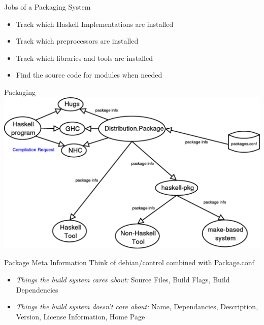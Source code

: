 \documentclass[pdf,rico,slideColor,colorBG]{prosper}
\begin{document}
\begin{slide}{Jobs of a Packaging System}
  \begin{itemize}
  \item Track which Haskell Implementations are installed
  \item Track which preprocessors are installed
  \item Track which libraries and tools are installed
  \item Find the source code for modules when needed
  \end{itemize}
\end{slide}
\begin{slide}{Packaging}
   \includegraphics[width=.9\textwidth]{Packaging.eps}
\end{slide}

\begin{slide}{Package Meta Information}
Think of debian/control combined with Package.conf
\begin{itemize}
  \item \emph{Things the build system cares about:} Source Files, Build Flags, Build Dependencies
  \item \emph{Things the build system doesn't care about:} Name, Dependancies, Description, Version, License Information, Home Page
\end{itemize}
\end{slide}
\end{document}
